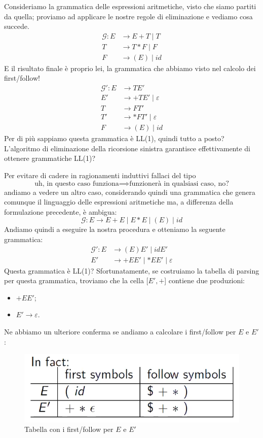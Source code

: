 \documentclass[class=book, crop=false, oneside, 12pt]{standalone}
\begin{document}
Consideriamo la grammatica delle espressioni aritmetiche, visto che siamo partiti da quella; proviamo ad applicare le nostre regole di eliminazione e vediamo cosa succede.
\begin{align*}
    \label{non-ll1_grammar}
    \mathcal{G}: E &\to E+T \mid T \\
    T &\to T*F \mid F \nonumber \\
    F &\to (E) \mid id \nonumber 
\end{align*}
E il risultato finale è proprio lei, la grammatica che abbiamo visto nel calcolo dei first/follow!
\begin{align*}
    \mathcal{G'}: E &\rightarrow TE' \\
    E' &\rightarrow +TE' \mid \varepsilon \\
    T &\rightarrow FT' \\
    T' &\rightarrow *FT' \mid \varepsilon \\
    F &\rightarrow (E) \mid id
\end{align*}
Per di più sappiamo questa grammatica è LL(1), quindi tutto a posto? L'algoritmo di eliminazione della ricorsione sinistra garantisce effettivamente di ottenere grammatiche LL(1)?

Per evitare di cadere in ragionamenti induttivi fallaci del tipo 
\begin{equation*}
    \textrm{uh, in questo caso funziona} \implies \textrm{funzionerà in qualsiasi caso, no?}
\end{equation*}
andiamo a vedere un altro caso, considerando quindi una grammatica che genera comunque il linguaggio delle espressioni aritmetiche ma, a differenza della formulazione precedente, è ambigua:
\begin{equation*}
    \mathcal{G}: E \to E + E \mid E * E \mid (E) \mid id
\end{equation*}
Andiamo quindi a eseguire la nostra procedura e otteniamo la seguente grammatica:
\begin{align*}
    \mathcal{G'}: E &\to (E)E' \mid idE' \\
    E' &\to +EE' \mid \ast EE' \mid \varepsilon
\end{align*}
Questa grammatica è LL(1)? Sfortunatamente, se costruiamo la tabella di parsing per questa grammatica, troviamo che la cella [\(E', +\)] contiene due produzioni:
\begin{itemize}[noitemsep]
    \item \(+EE'\);
    \item \(E' \to \varepsilon\).
\end{itemize}
Ne abbiamo un ulteriore conferma se andiamo a calcolare i first/follow per \(E\) e \(E'\):
\begin{figure}[H]
    \centering
    \includegraphics[width=.4\textwidth,keepaspectratio]{fxness-lrremove-fftable.png}
    \caption{Tabella con i first/follow per \(E\) e \(E'\)}
    \label{fxness-lrremove- fftable}
\end{figure}
\end{document}
